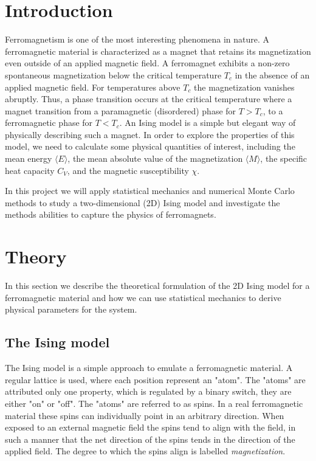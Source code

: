 \documentclass[a4paper]{article}
\begin{document}
\section{Introduction}
Ferromagnetism is one of the most interesting phenomena in nature. A ferromagnetic material is characterized as a magnet that retains its magnetization even outside of an applied magnetic field. A ferromagnet exhibits a non-zero spontaneous magnetization below the critical temperature $T_c$ in the absence of an applied magnetic field. For temperatures above $T_c$ the magnetization vanishes abruptly. Thus, a phase transition occurs at the critical temperature where a magnet transition from a paramagnetic (disordered) phase for $T > T_c$, to a ferromagnetic phase for $T<T_c$. An Ising model is a simple but elegant way of physically describing such a magnet. In order to explore the properties of this model, we need to calculate some physical quantities of interest, including the mean energy  $\langle E \rangle$, the mean absolute value of the magnetization  $\langle M \rangle$, the specific heat capacity $C_V$, and the magnetic susceptibility $\chi$.

In this project we will apply statistical mechanics and numerical Monte Carlo methods to study a two-dimensional (2D) Ising model and investigate the methods abilities to capture the physics of ferromagnets.

\section{Theory}
In this section we describe the theoretical formulation of the 2D Ising model for a ferromagnetic material and how we can use statistical mechanics to derive physical parameters for the system.
%
\subsection{The Ising model}
The Ising model is a simple approach to emulate a ferromagnetic material.   A regular lattice is used, where each position represent an "atom". The "atoms" are attributed only one property, which is regulated by a binary switch, they are either "on" or "off". The "atoms" are referred to as spins. In a real ferromagnetic material these spins can individually point in an arbitrary direction. When exposed to an external magnetic field the spins tend to align with the field, in such a manner that the net direction of the spins tends in the direction of the applied field. The degree to which the spins align is labelled \textit{magnetization}.
\end{document}
